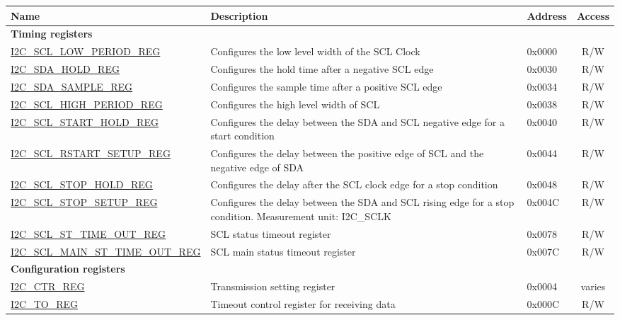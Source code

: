 \begin{longtable}{ | p{5.8cm} | p{6.8cm} | p{1.3cm} | c | }
\hline\rowcolor{lightgray}
\textbf{Name} & \textbf{Description} &  \textbf{Address} & \textbf{Access} \\ \hline
\endhead
\multicolumn{4}{|l|}{\textbf{Timing registers}} \\ \hline
\hyperref[regdesc:I2CSCLLOWPERIODREG]{I2C\_SCL\_LOW\_PERIOD\_REG} & Configures the low level width of the SCL Clock & 0x0000 & R/W \\ \hline
\hyperref[regdesc:I2CSDAHOLDREG]{I2C\_SDA\_HOLD\_REG} & Configures the hold time after a negative SCL edge & 0x0030 & R/W \\ \hline
\hyperref[regdesc:I2CSDASAMPLEREG]{I2C\_SDA\_SAMPLE\_REG} & Configures the sample time after a positive SCL edge & 0x0034 & R/W \\ \hline
\hyperref[regdesc:I2CSCLHIGHPERIODREG]{I2C\_SCL\_HIGH\_PERIOD\_REG} & Configures the high level width of SCL & 0x0038 & R/W \\ \hline
\hyperref[regdesc:I2CSCLSTARTHOLDREG]{I2C\_SCL\_START\_HOLD\_REG} & Configures the delay between the SDA and SCL negative edge for a start condition & 0x0040 & R/W \\ \hline
\hyperref[regdesc:I2CSCLRSTARTSETUPREG]{I2C\_SCL\_RSTART\_SETUP\_REG} & Configures the delay between the positive edge of SCL and the negative edge of SDA & 0x0044 & R/W \\ \hline
\hyperref[regdesc:I2CSCLSTOPHOLDREG]{I2C\_SCL\_STOP\_HOLD\_REG} & Configures the delay after the SCL clock edge for a stop condition & 0x0048 & R/W \\ \hline
\hyperref[regdesc:I2CSCLSTOPSETUPREG]{I2C\_SCL\_STOP\_SETUP\_REG} & Configures the delay between the SDA and SCL rising edge for a stop condition. Measurement unit: I2C\_SCLK & 0x004C & R/W \\ \hline
\hyperref[regdesc:I2CSCLSTTIMEOUTREG]{I2C\_SCL\_ST\_TIME\_OUT\_REG} & SCL status timeout register & 0x0078 & R/W \\ \hline
\hyperref[regdesc:I2CSCLMAINSTTIMEOUTREG]{I2C\_SCL\_MAIN\_ST\_TIME\_OUT\_REG} & SCL main status timeout register & 0x007C & R/W \\ \hline
\multicolumn{4}{|l|}{\textbf{Configuration registers}} \\ \hline
\hyperref[regdesc:I2CCTRREG]{I2C\_CTR\_REG} & Transmission setting register & 0x0004 & varies \\ \hline
\hyperref[regdesc:I2CTOREG]{I2C\_TO\_REG} & Timeout control register for receiving data & 0x000C & R/W \\ \hline

\end{longtable}
